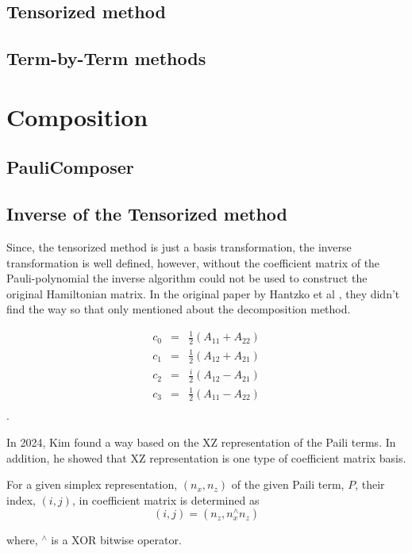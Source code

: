 \subsection{Tensorized method}


\subsection{Term-by-Term methods}

\section{Composition}
\subsection{PauliComposer}

\subsection{Inverse of the Tensorized method}

Since, the tensorized method is just a basis transformation, 
the inverse transformation is well defined, 
however, without the coefficient matrix of the Pauli-polynomial 
the inverse algorithm could not be used to construct the original 
Hamiltonian matrix. In the original paper by Hantzko et al \cite{hantzko_tensorized_2023},
they didn't find the way so that only mentioned about the decomposition method.

\begin{equation}
    \label{eq:restore}
    \begin{array}{ccc}
        c_0 &=& \frac{1}{2} (A_{11} + A_{22})\\
        c_1 &=& \frac{1}{2} (A_{12} + A_{21})\\
        c_2 &=& \frac{i}{2} (A_{12} - A_{21})\\
        c_3 &=& \frac{1}{2} (A_{11} - A_{22})\\
    \end{array}
\end{equation}.

In 2024, Kim found a way based on the XZ representation of the 
Paili terms. In addition, he showed that XZ representation is one type of 
coefficient matrix basis.

\begin{theorem}
    For a given simplex representation, $(n_x, n_z)$ of the given Paili term, $P$,
    their index, $(i, j)$, in coefficient matrix is determined as 
    $$(i, j) = (n_z, n_x^\wedge n_z)$$

    where, ${}^\wedge$ is a XOR bitwise operator. 
\end{theorem}

